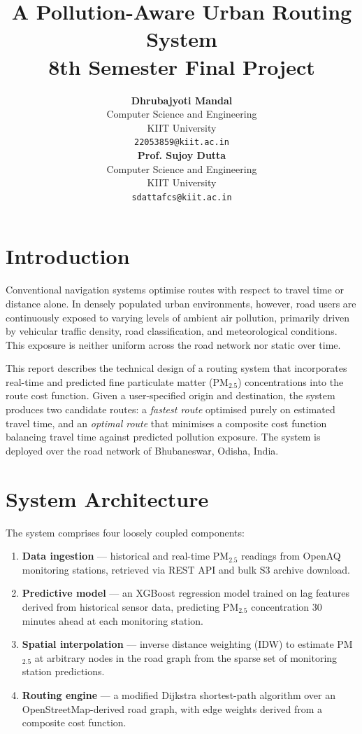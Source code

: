 \documentclass[12pt,a4paper]{article}
\title{
  \textbf{A Pollution-Aware Urban Routing System} \\[-0em]
  \large 8th Semester Final Project \\[-0.7em]
}
\author{
  \begin{tabular}{c}
    \textbf{Dhrubajyoti Mandal} \\
    Computer Science and Engineering \\
    KIIT University \\
    \texttt{22053859@kiit.ac.in}
  \end{tabular}
  \begin{tabular}{c}
    \textbf{Prof. Sujoy Dutta} \\
    Computer Science and Engineering \\
    KIIT University \\
    \texttt{sdattafcs@kiit.ac.in}
  \end{tabular}
}
\date{}
\begin{document}
\vspace{-5em}
\maketitle
\vspace{-3em}
\tableofcontents
\newpage

\section{Introduction}

Conventional navigation systems optimise routes with respect to travel time or distance alone. In densely populated urban environments, however, road users are continuously exposed to varying levels of ambient air pollution, primarily driven by vehicular traffic density, road classification, and meteorological conditions. This exposure is neither uniform across the road network nor static over time.

This report describes the technical design of a routing system that incorporates real-time and predicted fine particulate matter (PM$_{2.5}$) concentrations into the route cost function. Given a user-specified origin and destination, the system produces two candidate routes: a \textit{fastest route} optimised purely on estimated travel time, and an \textit{optimal route} that minimises a composite cost function balancing travel time against predicted pollution exposure. The system is deployed over the road network of Bhubaneswar, Odisha, India.

\section{System Architecture}

The system comprises four loosely coupled components:

\begin{enumerate}
  \item \textbf{Data ingestion} --- historical and real-time PM$_{2.5}$ readings from OpenAQ monitoring stations, retrieved via REST API and bulk S3 archive download.
  \item \textbf{Predictive model} --- an XGBoost regression model trained on lag features derived from historical sensor data, predicting PM$_{2.5}$ concentration 30 minutes ahead at each monitoring station.
  \item \textbf{Spatial interpolation} --- inverse distance weighting (IDW) to estimate PM$_{2.5}$ at arbitrary nodes in the road graph from the sparse set of monitoring station predictions.
  \item \textbf{Routing engine} --- a modified Dijkstra shortest-path algorithm over an OpenStreetMap-derived road graph, with edge weights derived from a composite cost function.
\end{enumerate}
\end{document}
